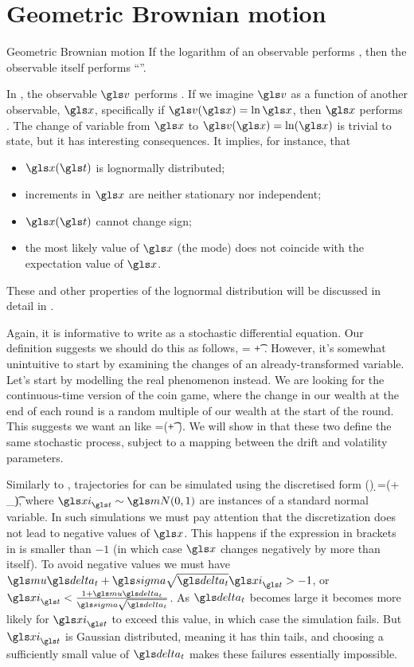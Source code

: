 \section{Geometric Brownian motion}
\begin{defn}{Geometric Brownian motion}
If the logarithm of an observable performs \BM, then the observable itself performs ``\GBM''.
\end{defn}
In , the observable $\gv$ performs \BM. If we imagine $\gv$ as a function of another observable, $\x$, specifically if $\gv(\x)=\ln\x$, then $\x$ performs \GBM. The change of variable from $\x$ to $\gv(\x)=\ln(\x)$ is trivial to state, but it has interesting consequences. It implies, for instance, that 
\begin{itemize}
\item $\x(\t)$ is lognormally distributed;
\item increments in $\x$ are neither stationary nor independent;
\item $\x(\t)$ cannot change sign;
\item the most likely value of $\x$ (the mode) does not coincide with the expectation value of $\x$. 
\end{itemize}
These and other properties of the lognormal distribution will be discussed in detail in .

\boldhead{\SDE}
Again, it is informative to write \GBM as a stochastic differential equation. Our definition suggests we should do this as follows,
\be
\gd\ln\x = \tilde{\gmu}\gd\t + \tilde{\gsigma}\gd\gW.
\ee
However, it's somewhat unintuitive to start by examining the changes of an already-transformed variable. Let's start by modelling the real phenomenon instead. We are looking for the continuous-time version of the coin game, where the change in our wealth at the end of each round is a random multiple of our wealth at the start of the round. This suggests we want an \SDE like
\be
\gd\x=\x(\gmu \gd\t+ \gsigma \gd\gW).
\ee
We will show in  that these two \SDEs define the same stochastic process, subject to a mapping between the drift and volatility parameters.

Similarly to \BM, trajectories for \GBM can be simulated using the discretised form (\cf {})
\be
\d \x=\x(\gmu \dt+ \gsigma \sqrt{\dt} \gxi_\t),
\ee
where $\gxi_\t \sim \mN(0,1)$ are instances of a standard normal variable. In such simulations we must pay attention that the discretization does not lead to negative values of $\x$. This 
happens if the expression in brackets in  is smaller than $-1$ (in which case $\x$ changes negatively by more than itself). To avoid negative values we must have $\gmu \dt + \gsigma \sqrt{\dt} \gxi_\t>-1$, or  $\gxi_\t <\frac{1+\gmu\dt}{\gsigma \sqrt{\dt}}$. As $\dt$ becomes large it becomes more likely for $\gxi_\t$ to exceed this value, in which case the simulation fails. But $\gxi_\t$ is Gaussian distributed, meaning it has thin tails, and choosing a sufficiently small value of $\dt$ makes these failures essentially impossible.

